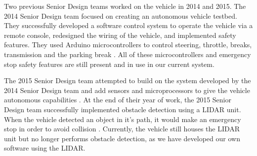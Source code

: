 Two previous Senior Design teams worked on the vehicle in 2014 and 2015.  The 2014 Senior Design team focused on creating an autonomous vehicle testbed.  They successfully developed a software control system to operate the vehicle via a remote console, redesigned the wiring of the vehicle, and implemented safety features.  They used Arduino microcontrollers to control steering, throttle, breaks, transmission and the parking break \cite{rslrover2014}.  All of these microcontrollers and emergency stop safety features are still present and in use in our current system.

The 2015 Senior Design team attempted to build on the system developed by the 2014 Senior Design team and add sensors and microprocessors to  give the vehicle autonomous capabilities \cite{rslrover2015}.  At the end of their year of work, the 2015 Senior Design team successfully implemented obstacle detection using a LIDAR unit.  When the vehicle detected an object in it's path, it would make an emergency stop in order to avoid collision \cite{rslrover2015}. Currently, the vehicle still houses the LIDAR unit but no longer performs obstacle detection, as we have developed our own software using the LIDAR. 

